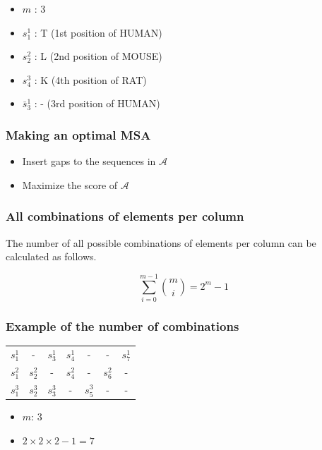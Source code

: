\begin{itemize}
\item $m$ :	3
\item $s_1^1$ : T (1st position of HUMAN)
\item $s_2^2$ : L (2nd position of MOUSE)
\item $s_4^3$ : K (4th position of RAT)
\item $\bar{s}_3^1$ : - (3rd position of HUMAN)
\end{itemize}

%
%
\subsubsection*{Making an optimal MSA} 

\begin{itemize}
\item Insert gaps to the sequences in $\mathcal{A}$
\item Maximize the score of $\mathcal{A}$
\end{itemize}

%
%
\subsubsection*{All combinations of elements per column} 
The number of all possible combinations of elements per column can be calculated as follows.

\[
\sum_{i=0}^{m-1} \binom{m}{i}  = 2^m - 1
\]

%
%
\subsubsection*{Example of the number of combinations} 

\begin{table}[H]
\begin{tabular}{ccccccc}
$s_1^1$ & - & $s_3^1$ & $s_4^1$ & - & - & $s_7^1$ \\
$s_1^2$ & $s_2^2$ & - & $s_4^2$ & - & $s_6^2$ & - \\
$s_1^3$ & $s_2^3$ & $s_3^3$ & - & $s_5^3$ & - & -                     
\end{tabular}
\end{table}

\begin{itemize}
\item $m$: 3
\item $2 \times 2 \times 2 - 1 = 7$
\end{itemize}

